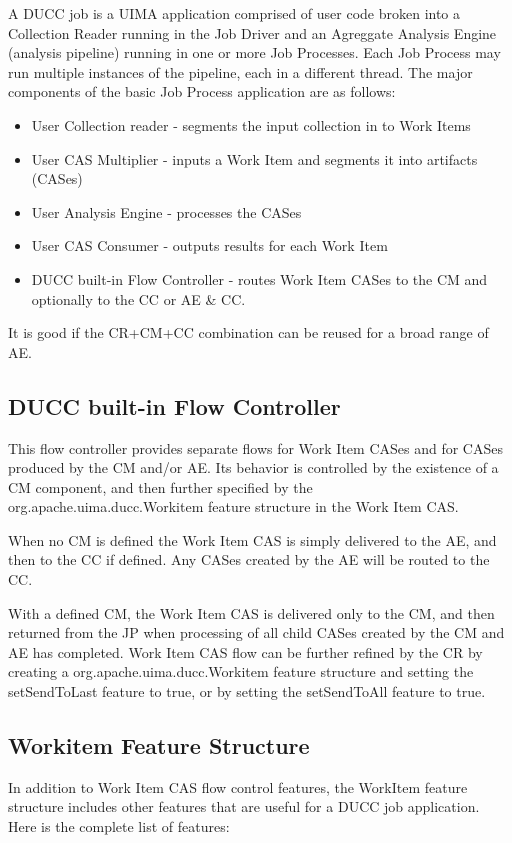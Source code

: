 A DUCC job is a UIMA application comprised of user code broken into a Collection
Reader running in the Job Driver and an Agreggate Analysis Engine (analysis pipeline) running in one 
or more Job Processes. Each Job Process may run multiple instances of the pipeline, each in a different
thread. The major components of the basic Job Process application are as follows:

\begin{itemize}
  \item User Collection reader - segments the input collection in to Work Items
  \item User CAS Multiplier - inputs a Work Item and segments it into artifacts (CASes)
  \item User Analysis Engine - processes the CASes
  \item User CAS Consumer - outputs results for each Work Item
  \item DUCC built-in Flow Controller - routes Work Item CASes to the CM and optionally to the CC or AE \& CC.
\end{itemize}

It is good if the CR+CM+CC combination can be reused for a broad range of AE.

\subsection{DUCC built-in Flow Controller}
\begin{sloppypar}
This flow controller provides separate flows for Work Item CASes and for CASes produced by the CM and/or AE.
Its behavior is controlled by the existence of a CM component, and then further specified by the
org.apache.uima.ducc.Workitem feature structure in the Work Item CAS.
\end{sloppypar}

When no CM is defined the Work Item CAS is simply delivered to the AE, and then to the CC if defined. 
Any CASes created by the AE will be routed to the CC.

With a defined CM, the Work Item CAS is delivered only to the CM, and then returned from the JP when processing
of all child CASes created by the CM and AE has completed. Work Item CAS flow can be further refined by the CR by
creating a org.apache.uima.ducc.Workitem feature structure and setting the setSendToLast feature to true,
or by setting the setSendToAll feature to true.

\subsection{Workitem Feature Structure}
In addition to Work Item CAS flow control features, the WorkItem feature structure includes other features that are useful
for a DUCC job application. Here is the complete list of features:

